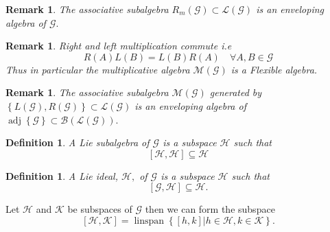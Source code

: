 \documentclass[aps,preprint]{revtex4}%
\newtheorem{definition}[theorem]{Definition}
\newtheorem{remark}[theorem]{Remark}
\begin{document}
\begin{remark}
The associative subalgebra $R_{m}\left(  \mathcal{G}\right)  \subset
\mathcal{L}\left(  \mathcal{G}\right)  $ is an \emph{enveloping algebra} of
$\mathcal{G}.$
\end{remark}

\begin{remark}
Right and left multiplication commute i.e
\begin{equation}
R\left(  A\right)  L\left(  B\right)  =L\left(  B\right)  R\left(  A\right)
\quad\forall A,B\in\mathcal{G}%
\end{equation}
Thus in particular the multiplicative algebra $\mathcal{M}\left(
\mathcal{G}\right)  $ is a \emph{Flexible algebra.}
\end{remark}

\begin{remark}
The associative subalgebra $\mathcal{M}\left(  \mathcal{G}\right)  $ generated
by $\left\{  L\left(  \mathcal{G}\right)  ,R\left(  \mathcal{G}\right)
\right\}  \subset\mathcal{L}\left(  \mathcal{G}\right)  $ is an
\emph{enveloping algebra} of $\operatorname{adj}\left\{  \mathcal{G}\right\}
\subset\mathcal{B}\left(  \mathcal{L}\left(  \mathcal{G}\right)  \right)  .$
\end{remark}

\begin{definition}
A \emph{Lie subalgebra} of $\mathcal{G}$ is a subspace $\mathcal{H}$ such
that
\begin{equation}
\left[  \mathcal{H},\mathcal{H}\right]  \subseteq\mathcal{H}%
\end{equation}

\end{definition}

\begin{definition}
A \emph{Lie ideal}, $\mathcal{H},$ of $\mathcal{G}$ is a subspace
$\mathcal{H}$ such that
\begin{equation}
\left[  \mathcal{G},\mathcal{H}\right]  \subseteq\mathcal{H}.
\end{equation}

\end{definition}

Let $\mathcal{H}$ and $\mathcal{K}$ be subspaces of $\mathcal{G}$ then we can
form the subspace $\ $
\begin{equation}
\left[  \mathcal{H},\mathcal{K}\right]  =\operatorname*{linspan}\left\{
\left.  \left[  h,k\right]  \right\vert h\in\mathcal{H},k\in\mathcal{K}%
\right\}  .
\end{equation}
\end{document}
